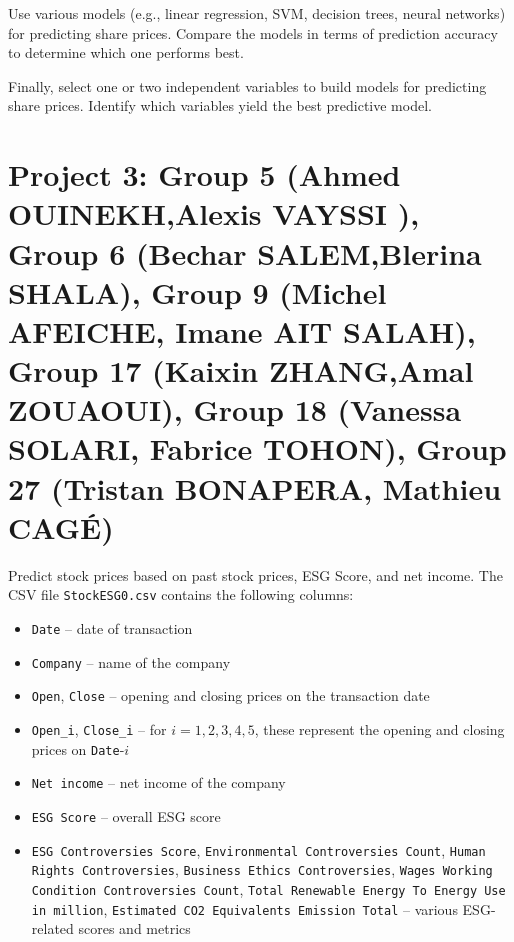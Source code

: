 \documentclass{article}
\begin{document}
Use various models (e.g., linear regression, SVM, decision trees, neural networks) for predicting share prices. Compare the models in terms of prediction accuracy to determine which one performs best.

Finally, select one or two independent variables to build models for predicting share prices. Identify which variables yield the best predictive model.





















\section*{Project 3:  Group 5 (Ahmed	OUINEKH,Alexis	VAYSSI
), Group 6 (Bechar	SALEM,Blerina	SHALA), Group 9 (Michel	AFEICHE, Imane	AIT SALAH),
Group 17 (Kaixin	ZHANG,Amal	ZOUAOUI),
Group 18 (Vanessa	SOLARI, Fabrice	TOHON), Group 27 (Tristan	BONAPERA, Mathieu	CAGÉ)
}
 Predict stock prices based on past stock prices, ESG Score, and net income. The CSV file \lstinline$StockESG0.csv$ contains the following columns: \begin{itemize} \item \lstinline$Date$ -- date of transaction \item \lstinline$Company$ -- name of the company \item \lstinline$Open$, \lstinline$Close$ -- opening and closing prices on the transaction date \item \lstinline$Open_i$, \lstinline$Close_i$ -- for $i=1,2,3,4,5$, these represent the opening and closing prices on \lstinline$Date$-$i$ \item \lstinline$Net income$ -- net income of the company \item \lstinline$ESG Score$ -- overall ESG score \item \lstinline$ESG Controversies Score$, \lstinline$Environmental Controversies Count$, \lstinline$Human Rights Controversies$, \lstinline$Business Ethics Controversies$, \lstinline$Wages Working Condition Controversies Count$, \lstinline$Total Renewable Energy To Energy Use in million$, \lstinline$Estimated CO2 Equivalents Emission Total$ -- various ESG-related scores and metrics \end{itemize}
\end{document}
